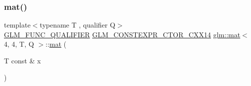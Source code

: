 \subsubsection{\texorpdfstring{mat()}{mat()}\hspace{0.1cm}{\footnotesize\ttfamily [4/21]}}
{\footnotesize\ttfamily template$<$typename T , qualifier Q$>$ \\
\mbox{\hyperlink{setup_8hpp_a33fdea6f91c5f834105f7415e2a64407}{G\+L\+M\+\_\+\+F\+U\+N\+C\+\_\+\+Q\+U\+A\+L\+I\+F\+I\+ER}} \mbox{\hyperlink{setup_8hpp_a0900f9145e68bf6061b6f5e7be3fa751}{G\+L\+M\+\_\+\+C\+O\+N\+S\+T\+E\+X\+P\+R\+\_\+\+C\+T\+O\+R\+\_\+\+C\+X\+X14}} \mbox{\hyperlink{structglm_1_1mat}{glm\+::mat}}$<$ 4, 4, T, Q $>$\+::\mbox{\hyperlink{structglm_1_1mat}{mat}} (\begin{DoxyParamCaption}\item[{T const \&}]{x }\end{DoxyParamCaption})\hspace{0.3cm}{\ttfamily [explicit]}}

\mbox{\label{structglm_1_1mat_3_014_00_014_00_01_t_00_01_q_01_4_a438e4c1e65784ac11fcd29f4ae55e9c7}} 
